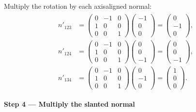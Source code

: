 \documentclass[letterpaper,11pt,english,openany,oneside]{jupyterBook}
\begin{document}
\sphinxAtStartPar
Multiply the rotation by each axis\sphinxhyphen{}aligned normal:
{\color{QuizMathBlue} \begin{equation*}
\begin{split}
\begin{aligned}
n'_{123}&=\begin{pmatrix}0&-1&0\\1&0&0\\0&0&1\end{pmatrix}\begin{pmatrix}-1\\0\\0\end{pmatrix}
=\begin{pmatrix}0\\-1\\0\end{pmatrix},\\
n'_{124}&=\begin{pmatrix}0&-1&0\\1&0&0\\0&0&1\end{pmatrix}\begin{pmatrix}0\\0\\-1\end{pmatrix}
=\begin{pmatrix}0\\0\\-1\end{pmatrix},\\
n'_{134}&=\begin{pmatrix}0&-1&0\\1&0&0\\0&0&1\end{pmatrix}\begin{pmatrix}0\\-1\\0\end{pmatrix}
=\begin{pmatrix}1\\0\\0\end{pmatrix}.
\end{aligned}
\end{split}
\end{equation*}}
\par

\par\medskip{}
{\color{QuizStepRed}\bfseries Step 4 — Multiply the slanted normal}\par\smallskip
\end{document}
